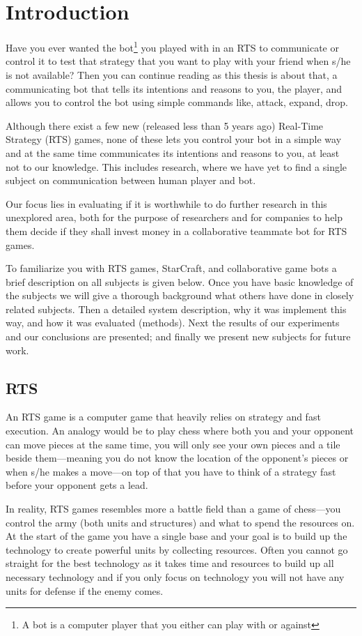 \chapter{Introduction}
Have you ever wanted the bot\footnote{A bot is a computer player that you either can play with or
against} you played with in an RTS to communicate or control it to test that strategy that you want
to play with your friend when s/he is not available? Then you can continue reading as this thesis is
about that, a communicating bot that tells its intentions and reasons to you, the player, and allows
you to control the bot using simple commands like, attack, expand, drop.

Although there exist a few new (released less than 5 years ago) Real-Time Strategy (RTS) games, none
of these lets you control your bot in a simple way and at the same time communicates its intentions
and reasons to you, at least not to our knowledge. This includes research, where we have yet to find
a single subject on communication between human player and bot.

Our focus lies in evaluating if it is worthwhile to do further research in this unexplored area,
both for the purpose of researchers and for companies to help them decide if they shall invest
money in a collaborative teammate bot for RTS games.

To familiarize you with RTS games, StarCraft, and collaborative game bots a brief description on all
subjects is given below. Once you have basic knowledge of the subjects we will give a thorough
background what others have done in closely related subjects. Then a detailed system description,
why it was implement this way, and how it was evaluated (methods). Next the results of our
experiments and our conclusions are presented; and finally we present new subjects for future work.

\section{RTS}
An RTS game is a computer game that heavily relies on strategy and fast execution. An analogy would
be to play chess where both you and your opponent can move pieces at the same time, you will only
see your own pieces and a tile beside them—meaning you do not know the location of the opponent’s
pieces or when s/he makes a move—on top of that you have to think of a strategy fast before your
opponent gets a lead.

In reality, RTS games resembles more a battle field than a game of chess—you control the army (both
units and structures) and what to spend the resources on. At the start of the game you have a single
base and your goal is to build up the technology to create powerful units by collecting resources.
Often you cannot go straight for the best technology as it takes time and resources to build up all
necessary technology and if you only focus on technology you will not have any units for defense if
the enemy comes.

